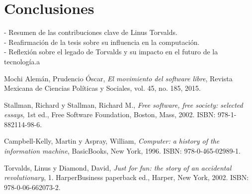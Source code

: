 \documentclass[a4paper,12pt]{article}
\begin{document}
\section{Conclusiones} 
- Resumen de las contribuciones clave de Linus
Torvalds.\\ 
- Reafirmación de la tesis sobre su influencia en la computación.\\

- Reflexión sobre el legado de Torvalds y su impacto en el futuro de la
tecnología.a
\newpage

\begin{thebibliography}{9}

Mochi Alemán, Prudencio Óscar, \textit{El movimiento del software libre}, Revista Mexicana de Ciencias Políticas y Sociales, vol. 45, no. 185, 2015.

Stallman, Richard y Stallman, Richard M., \textit{Free software, free society: selected essays}, 1st ed., Free Software Foundation, Boston, Mass, 2002. ISBN: 978-1-882114-98-6.

Campbell-Kelly, Martin y Aspray, William, \textit{Computer: a history of the information machine}, BasicBooks, New York, 1996. ISBN: 978-0-465-02989-1.

Torvalds, Linus y Diamond, David, \textit{Just for fun: the story of an accidental revolutionary}, 1. HarperBusiness paperback ed., Harper, New York, 2002. ISBN: 978-0-06-662073-2.

\end{thebibliography}
\end{document}

